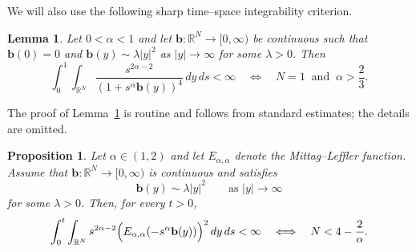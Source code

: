 \documentclass[12pt, reqno]{amsart}
\newcommand{\R}{\ensuremath{\mathbb{R}}}
\newtheorem{proposition}{Proposition}[section]
\newtheorem{lemma}{Lemma}[section]
\begin{document}
We will also use the following sharp time--space integrability criterion. 
\begin{lemma}\label{lem:b}
Let $0<\alpha<1$ and let $\mathbf b:\R^N\to[0,\infty)$ be continuous such that
$\mathbf b(0)=0$ and $\mathbf b(y)\sim \lambda|y|^2$ as $|y|\to\infty$ for some $\lambda>0$.
Then
\[
\int_0^1\int_{\R^N}\frac{s^{2\alpha-2}}{(1+s^\alpha \mathbf b(y))^4}\,dy\,ds<\infty
\quad\Longleftrightarrow\quad
N=1\ \text{ and }\ \alpha>\frac23.
\]
\end{lemma}
The proof of Lemma~\ref{lem:b} is routine and follows from standard estimates; the details are omitted.
\begin{proposition}\label{prop:integrability-Eaa}
Let $\alpha\in(1,2)$ and let $E_{\alpha,\alpha}$ denote the Mittag--Leffler function.
Assume that $\mathbf b:\R^N\to[0,\infty)$ is continuous and satisfies
\begin{equation}\label{eq:b-asympt}
\mathbf b(y)\sim \lambda |y|^2 \qquad \text{as } |y|\to\infty
\end{equation}
for some $\lambda>0$. Then, for every $t>0$,
\[
\int_0^t\int_{\R^N} s^{2\alpha-2}\Bigl(E_{\alpha,\alpha}(-s^\alpha \mathbf b(y))\Bigr)^2\,dy\,ds<\infty
\quad\Longleftrightarrow\quad
N<4-\frac{2}{\alpha}.
\]
\end{proposition}
\end{document}
